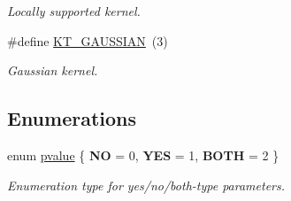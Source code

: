 \begin{DoxyCompactItemize}
\begin{DoxyCompactList}\small\item\em Locally supported kernel. \end{DoxyCompactList}\item 
\hypertarget{group__applications__fastsumS2__test_ga3a03d7fde39f1ba22a4549e72c8cbf39}{\#define \hyperlink{group__applications__fastsumS2__test_ga3a03d7fde39f1ba22a4549e72c8cbf39}{K\-T\-\_\-\-G\-A\-U\-S\-S\-I\-A\-N}~(3)}\label{group__applications__fastsumS2__test_ga3a03d7fde39f1ba22a4549e72c8cbf39}

\begin{DoxyCompactList}\small\item\em Gaussian kernel. \end{DoxyCompactList}\end{DoxyCompactItemize}
\subsection*{Enumerations}
\begin{DoxyCompactItemize}
\item 
enum \hyperlink{group__applications__fastsumS2__test_gad09943f93b91eb526d8081a4963eead8}{pvalue} \{ {\bfseries N\-O} = 0, 
{\bfseries Y\-E\-S} = 1, 
{\bfseries B\-O\-T\-H} = 2
 \}
\begin{DoxyCompactList}\small\item\em Enumeration type for yes/no/both-\/type parameters. \end{DoxyCompactList}\end{DoxyCompactItemize}
